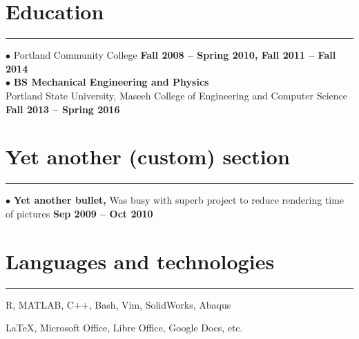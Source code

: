 \section{Education}
    \noindent\rule{\textwidth}{\hlinewidth}
    $\bullet$ Portland Community College
	    \hfill\textbf{Fall 2008 -- Spring 2010, Fall 2011 -- Fall 2014}\\
    $\bullet$ \textbf{BS Mechanical Engineering and Physics}\\
                      Portland State University, Maseeh College of Engineering and Computer Science
                      \hfill\textbf{Fall 2013 -- Spring 2016}\\

\section{Yet another (custom) section}
\noindent\rule{\textwidth}{\hlinewidth}
    $\bullet$ \textbf{Yet another bullet,}
    Was busy with superb project to reduce rendering time of pictures
\hfill\textbf{Sep 2009 -- Oct 2010}\\

\section{Languages and technologies}

\noindent\rule{\textwidth}{\hlinewidth}
    \begin{innerlist}
        \item R, MATLAB, C++, Bash, Vim, SolidWorks, Abaqus
        \item \LaTeX, Microsoft Office, Libre Office, Google Docs, etc.
    \end{innerlist}

